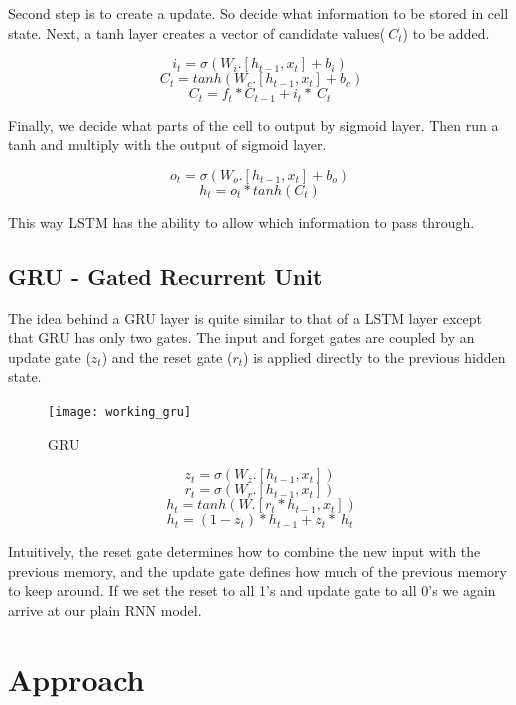 \documentclass[runningheads]{llncs}
\begin{document}
Second step is to create a update. So decide what information to be stored in cell state. Next, a tanh layer creates a vector of candidate values($~C_t$) to be added.

\[i_t = \sigma(W_i.[h_{t-1},x_t] + b_i) \]
\[~C_t = tanh(W_c.[h_{t-1},x_t] + b_c) \]
\[C_t = f_t * C_{t-1} + i_t * ~C_t \]

Finally, we decide what parts of the cell to output by sigmoid layer. Then run a tanh and multiply with the output of sigmoid layer.

\[o_t = \sigma(W_o.[h_{t-1},x_t] + b_o) \]
\[ h_t = o_t * tanh(C_t)\]

This way LSTM has the ability to allow which information to pass through.
 
\subsection{GRU -  Gated Recurrent Unit}

The idea behind a GRU layer is quite similar to that of a LSTM layer except that GRU has only two gates. The input and forget gates are coupled by an update gate ($z_t$) and the reset gate ($r_t$) is applied directly to the previous hidden state.  

\begin{figure}[h!]
\centering
        \texttt{[image: working\_gru]}
    \caption{GRU}
\end{figure}

\[z_t = \sigma(W_z.[h_{t-1},x_t]) \]
\[r_t = \sigma(W_r.[h_{t-1},x_t]) \]
\[~h_t = tanh(W.[r_t * h_{t-1},x_t]) \]
\[h_t = (1-z_t) * h_{t-1} + z_t * ~h_t \]

Intuitively, the reset gate determines how to combine the new input with the previous memory, and the update gate defines how much of the previous memory to keep around. If we set the reset to all 1’s and  update gate to all 0’s we again arrive at our plain RNN model.

\section{Approach}
\end{document}
